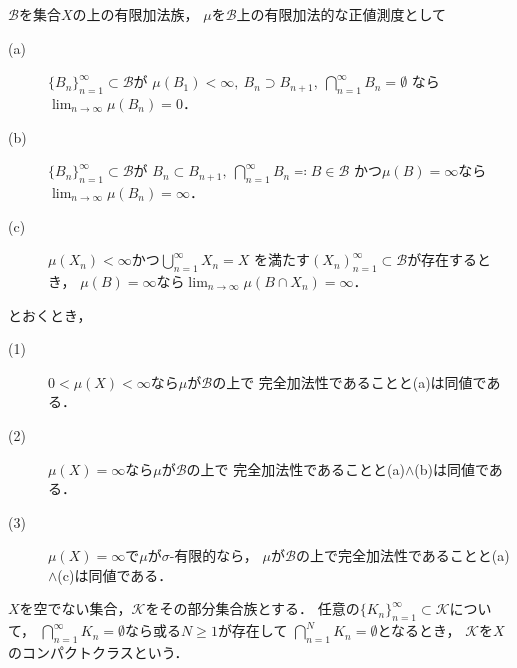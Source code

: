 		\begin{screen}
			\begin{thm}[完全加法性の同値条件]\label{thm:equivalent_conditions_of_countable_additivity}
				$\mathcal{B}$を集合$X$の上の有限加法族，
				$\mu$を$\mathcal{B}$上の有限加法的な正値測度として
				\begin{description}
					\item[(a)] $\{B_n\}_{n=1}^\infty \subset \mathcal{B}$が
						$\mu(B_1) < \infty,\ B_n \supset B_{n+1},\ \bigcap_{n=1}^\infty B_n = \emptyset$
						なら$\lim_{n \to \infty} \mu(B_n) = 0$．
						
					\item[(b)] $\{B_n\}_{n=1}^\infty \subset \mathcal{B}$が
						$B_n \subset B_{n+1},\ \bigcap_{n=1}^\infty B_n \eqqcolon B \in \mathcal{B}$
						かつ$\mu(B) = \infty$なら$\lim_{n \to \infty} \mu(B_n) = \infty$．
					
					\item[(c)] $\mu(X_n) < \infty$かつ$\bigcup_{n=1}^\infty X_n = X$
						を満たす$(X_n)_{n=1}^\infty \subset \mathcal{B}$が存在するとき，
						$\mu(B) = \infty$なら$\lim_{n \to \infty} \mu(B \cap X_n) = \infty$．
				\end{description}
				とおくとき，
				\begin{description}
					\item[(1)] $0 < \mu(X) < \infty$なら$\mu$が$\mathcal{B}$の上で
						完全加法性であることと(a)は同値である．
						
					\item[(2)] $\mu(X) = \infty$なら$\mu$が$\mathcal{B}$の上で
						完全加法性であることと(a)$\wedge$(b)は同値である．
						
					\item[(3)] $\mu(X) = \infty$で$\mu$が$\sigma$-有限的なら，
						$\mu$が$\mathcal{B}$の上で完全加法性であることと(a)$\wedge$(c)は同値である．
				\end{description}
			\end{thm}
		\end{screen}
		
		\begin{prf}
			
		\end{prf}
		
		\begin{screen}
			\begin{dfn}[コンパクトクラス]
				$X$を空でない集合，$\mathcal{K}$をその部分集合族とする．
				任意の$\{K_n\}_{n=1}^\infty \subset \mathcal{K}$について，
				$\bigcap_{n=1}^\infty K_n = \emptyset$なら或る$N \geq 1$が存在して
				$\bigcap_{n=1}^N K_n = \emptyset$となるとき，
				$\mathcal{K}$を$X$のコンパクトクラスという．
			\end{dfn}
		\end{screen}
		
